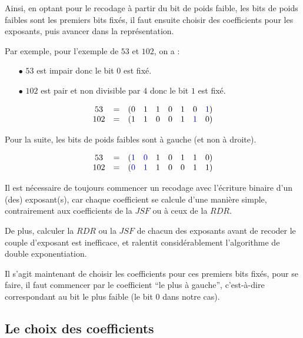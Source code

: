 \documentclass[12pt, a4paper]{memoir}
\begin{document}
   Ainsi, en optant pour le recodage à partir du bit de poids faible, les bits de poids faibles sont les 
   premiers bits fixés, il faut ensuite choisir des coefficients pour les exposants, puis avancer dans la représentation.
   
   Par exemple, pour l'exemple de $53$ et $102$, on a :
   \begin{itemize}
    \item [$\bullet$] $53$ est impair donc le bit $0$ est fixé.
    \item [$\bullet$] $102$ est pair et non divisible par $4$ donc le bit $1$ est fixé.
    \end{itemize}
    
 $$\begin{array}{ccccccccc}
  53 & = & (0 & 1 & 1 & 0 & 1 & 0 & \textcolor{blue}{1}) \\
  102 & = & (1 & 1 & 0 & 0 & 1 & \textcolor{blue}{1} & 0)
 \end{array}$$
 
 Pour la suite, les bits de poids faibles sont à gauche (et non à droite).
 
  $$\begin{array}{ccccccccc}
  53 & = & (\textcolor{blue}{1} & \textcolor{blue}{0} & 1 & 0 & 1 & 1 & 0) \\
  102 & = & (\textcolor{blue}{0} & \textcolor{blue}{1} & 1 & 0 & 0 & 1 & 1)
 \end{array}$$
 
 \begin{Remarque}
 Il est nécessaire de toujours commencer un recodage avec l'écriture binaire d'un (des) exposant(s), car chaque
 coefficient se calcule d'une manière simple, contrairement aux coefficients de la $JSF$ ou à ceux de la $RDR$.
 
 De plus, calculer la $RDR$ ou la $JSF$ de chacun des exposants avant de recoder le couple d'exposant est inefficace,
 et ralentit considérablement l'algorithme de double exponentiation.
 \end{Remarque}

 Il s'agit maintenant de choisir les coefficients pour ces premiers bits fixés, pour se faire, il faut commencer
 par le coefficient ``le plus à gauche'', c'est-à-dire correspondant au bit le plus faible (le bit $0$ dans notre cas).
 
 \subsection{Le choix des coefficients}
 
\end{document}
